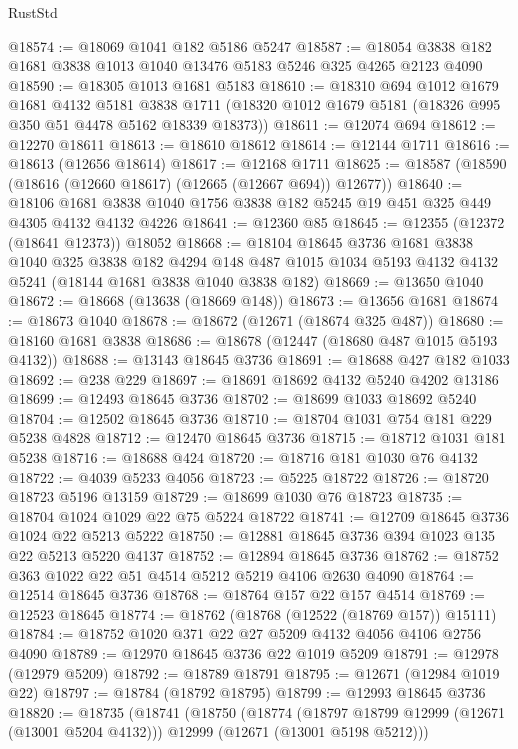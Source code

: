 \begin{lexlean}{RustStd}
\begin{coremodule}
@18574 := @18069 @1041 @182 @5186 @5247
@18587 := @18054 @3838 @182 @1681 @3838 @1013 @1040 @13476 @5183 @5246 @325 @4265 @2123 @4090
@18590 := @18305 @1013 @1681 @5183
@18610 := @18310
    @694
    @1012
    @1679
    @1681
    @4132
    @5181
    @3838
    @1711
    (@18320 @1012 @1679 @5181 (@18326 @995 @350 @51 @4478 @5162 @18339 @18373))
@18611 := @12074 @694
@18612 := @12270 @18611
@18613 := @18610 @18612
@18614 := @12144 @1711
@18616 := @18613 (@12656 @18614)
@18617 := @12168 @1711
@18625 := @18587 (@18590 (@18616 (@12660 @18617) (@12665 (@12667 @694)) @12677))
@18640 := @18106 @1681 @3838 @1040 @1756 @3838 @182 @5245 @19 @451 @325 @449 @4305 @4132 @4132 @4226
@18641 := @12360 @85
@18645 := @12355 (@12372 (@18641 @12373)) @18052
@18668 := @18104
    @18645
    @3736
    @1681
    @3838
    @1040
    @325
    @3838
    @182
    @4294
    @148
    @487
    @1015
    @1034
    @5193
    @4132
    @4132
    @5241
    (@18144 @1681 @3838 @1040 @3838 @182)
@18669 := @13650 @1040
@18672 := @18668 (@13638 (@18669 @148))
@18673 := @13656 @1681
@18674 := @18673 @1040
@18678 := @18672 (@12671 (@18674 @325 @487))
@18680 := @18160 @1681 @3838
@18686 := @18678 (@12447 (@18680 @487 @1015 @5193 @4132))
@18688 := @13143 @18645 @3736
@18691 := @18688 @427 @182 @1033
@18692 := @238 @229
@18697 := @18691 @18692 @4132 @5240 @4202 @13186
@18699 := @12493 @18645 @3736
@18702 := @18699 @1033 @18692 @5240
@18704 := @12502 @18645 @3736
@18710 := @18704 @1031 @754 @181 @229 @5238 @4828
@18712 := @12470 @18645 @3736
@18715 := @18712 @1031 @181 @5238
@18716 := @18688 @424
@18720 := @18716 @181 @1030 @76 @4132
@18722 := @4039 @5233 @4056
@18723 := @5225 @18722
@18726 := @18720 @18723 @5196 @13159
@18729 := @18699 @1030 @76 @18723
@18735 := @18704 @1024 @1029 @22 @75 @5224 @18722
@18741 := @12709 @18645 @3736 @1024 @22 @5213 @5222
@18750 := @12881 @18645 @3736 @394 @1023 @135 @22 @5213 @5220 @4137
@18752 := @12894 @18645 @3736
@18762 := @18752 @363 @1022 @22 @51 @4514 @5212 @5219 @4106 @2630 @4090
@18764 := @12514 @18645 @3736
@18768 := @18764 @157 @22 @157 @4514
@18769 := @12523 @18645
@18774 := @18762 (@18768 (@12522 (@18769 @157)) @15111)
@18784 := @18752 @1020 @371 @22 @27 @5209 @4132 @4056 @4106 @2756 @4090
@18789 := @12970 @18645 @3736 @22 @1019 @5209
@18791 := @12978 (@12979 @5209)
@18792 := @18789 @18791
@18795 := @12671 (@12984 @1019 @22)
@18797 := @18784 (@18792 @18795)
@18799 := @12993 @18645 @3736
@18820 := @18735
    (@18741
      (@18750
        (@18774
          (@18797 @18799 @12999 (@12671 (@13001 @5204 @4132)))
          @12999
          (@12671 (@13001 @5198 @5212)))

\end{coremodule}
\end{lexlean}

